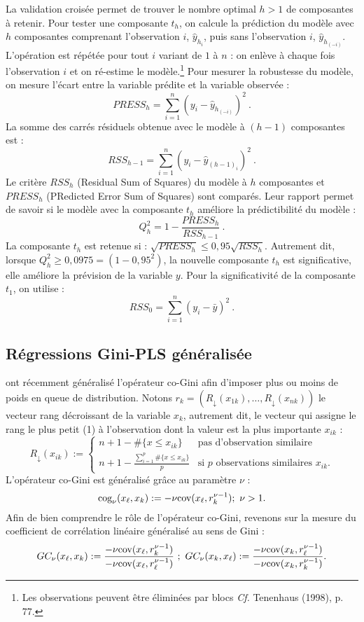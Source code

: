 La validation croisée permet de trouver le nombre optimal $h>1$ de composantes à retenir. Pour tester une composante $t_h$, on calcule la prédiction du modèle avec $h$ composantes comprenant l'observation $i$, $\hat{y}_{h_i}$, puis sans l'observation $i$, $\hat{y}_{h_{(-i)}}$. L'opération est répétée pour tout $i$ variant de $1$ à $n$ : on enlève à chaque fois l'observation $i$ et on ré-estime le modèle.\footnote{Les observations peuvent être éliminées par blocs \emph{Cf.} Tenenhaus (1998), p. 77.} Pour mesurer la robustesse du modèle, on mesure l'écart entre la variable prédite et la variable observée :
\[
PRESS_h = \sum\limits_{i=1}^n\left(y_i - \hat{y}_{h_{(-i)}}\right)^2 \ .
\]
La somme des carrés résiduels obtenue avec le modèle à $(h-1)$ composantes est : 
\[
RSS_{h-1} = \sum\limits_{i=1}^n \left(y_i - \hat{y}_{(h-1)_i}\right)^2 \ .
\]
Le critère $RSS_h$ (Residual Sum of Squares) du modèle à $h$ composantes et $PRESS_h$ (PRedicted Error Sum of Squares) sont comparés. Leur rapport permet de savoir si le modèle avec la composante $t_h$ améliore la prédictibilité du modèle :
\[
Q^2_h =1 - \frac{PRESS_h}{RSS_{h-1}} \ .
\]
La composante $t_h$ est retenue si : $\sqrt{PRESS_h} \leq 0,95 \sqrt{RSS_h}$. Autrement dit, lorsque $Q^2_h \geq 0,0975 = (1 - 0,95^2)$, la nouvelle composante $t_h$ est significative, elle améliore la prévision de la variable $y$. Pour la significativité de la composante $t_1$, on utilise :
\[
RSS_0 = \sum^{n}_{i = 1} \left(y_i - \bar{y}\right)^2 \ .
\]


\subsection{Régressions Gini-PLS généralisée} 

\citet{Schechtman03} ont récemment généralisé l'opérateur co-Gini afin d'imposer plus ou moins de poids en queue de distribution. Notons $r_{k}=(R_\downarrow(x_{1k}),\ldots, R_\downarrow(x_{nk}))$ le vecteur rang décroissant de la variable $x_k$, autrement dit, le vecteur qui assigne le rang le plus petit (1) à l'observation dont la valeur est la plus importante $x_{ik}$ :
\[
R_\downarrow(x_{ik}) :=
\left\{ \begin{array}{ll}
n+1- \#\{x \leq x_{ik} \} & \text{pas d'observation similaire} \\
n+1-\frac{\sum_{i=1}^p \#\{ x \leq x_{ik} \}}{p} & \text{si $p$ observations similaires $x_{ik}$.}
\end{array}
\right.
\]
L'opérateur co-Gini est généralisé grâce au paramètre $\nu$ :
\begin{equation}\label{cogg}
\text{cog}_\nu(x_\ell,x_k) := -\nu \text{cov}(x_\ell,r_{k}^{\nu-1}) ; \ \nu > 1.
\end{equation}
Afin de bien comprendre le rôle de l'opérateur co-Gini, revenons sur la mesure du coefficient de corrélation linéaire généralisé au sens de Gini :
\[
GC_\nu(x_\ell,x_k) := \frac{-\nu \text{cov}(x_\ell,r_{k}^{\nu-1})}{-\nu \text{cov}(x_\ell,r_{\ell}^{\nu-1})} \ ; \ GC_\nu(x_k,x_\ell) := \frac{-\nu \text{cov}(x_k,r_{\ell}^{\nu-1})}{-\nu \text{cov}(x_k,r_{k}^{\nu-1})}.
\]


